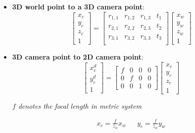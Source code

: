 \documentclass{article}
\begin{document}
\begin{itemize}
    \item \textbf{3D world point to a 3D camera point}:
    \begin{equation*}
        \begin{bmatrix}
            x_c \\ y_c \\ z_c \\ 1
        \end{bmatrix} = 
        \begin{bmatrix}
            r_{1, 1} & r_{1, 2} & r_{1, 3} & 
            t_1 \\
            r_{2, 1} & r_{2, 2} & r_{2, 3} & 
            t_2 \\
            r_{3, 1} & r_{3, 2} & r_{3, 3} & 
            t_3 \\
        \end{bmatrix}
        \begin{bmatrix}
            x_w \\ y_w \\ z_w \\ 1
        \end{bmatrix}
    \end{equation*}
    \item \textbf{3D camera point to 2D camera point}:
    \begin{equation*}
        \begin{bmatrix}
            x_c^d \\ y_c^d \\ 1
        \end{bmatrix} = 
        \begin{bmatrix}
            f & 0 & 0 & 0 \\
            0 & f & 0 & 0 \\
            0 & 0 & 1 & 0
        \end{bmatrix}
        \begin{bmatrix}
            x_c \\ y_c \\ z_c \\ 1
        \end{bmatrix}
    \end{equation*}
        
    \begin{center}
        \textit{$f$ denotes the focal length in metric system}
    \end{center}

    \begingroup
    \Large
    \begin{equation*}
        \begin{matrix}
            x_c = \frac{f}{z_w}x_w & & y_c = \frac{f}{z_w}y_w
        \end{matrix}
    \end{equation*}
    \endgroup


\end{itemize}
\end{document}
